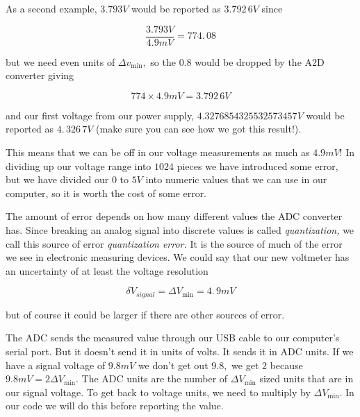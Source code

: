 As a second example, $3.793\unit{V}$ would be reported as $\allowbreak 3.792\,\allowbreak 6\unit{V}$ since 

\begin{equation*}
	\frac{3.793\unit{V}}{4.9\unit{mV}}=774.\,\allowbreak 08
\end{equation*}

\noindent but we need even units of $\Delta v_{\min },$ so the $0.8$ would be dropped by the A2D converter giving 

\begin{equation*}
	774\times 4.9\unit{mV}=\allowbreak 3.792\,\allowbreak 6\unit{V}
\end{equation*}

\noindent and our first voltage from our power supply, $4.3276854325532573457\unit{V}$ would be reported as $4.\,\allowbreak 326\,7\unit{V}$ (make sure you can see how we got this result!).

This means that we can be off in our voltage measurements as much as $4.9\unit{mV}$! In dividing up our voltage range into $1024$ pieces we have introduced some error, but we have divided our $0$ to $5\unit{V}$ into numeric values that we can use in our computer, so it is worth the cost of some error.

The amount of error depends on how many different values the ADC converter has. Since breaking an analog signal into discrete values is called \emph{quantization, }we call this source of error \emph{quantization error.} It is the source of much of the error we see in electronic measuring devices. We could say that our new voltmeter has an uncertainty of at least the voltage resolution

\begin{equation*}
	\delta V_{signal}=\Delta V_{\min }=4.\,\allowbreak 9\unit{mV}
\end{equation*}

\noindent but of course it could be larger if there are other sources of error.

The ADC sends the measured value through our USB cable to our computer's serial port. But it doesn't send it in units of volts. It sends it in ADC units. If we have a signal voltage of $9.8\unit{mV}$ we don't get out $9.8,$ we get $2$ because $9.8\unit{mV}=2\Delta V_{\min }.$ The ADC units are the number of $\Delta V_{\min }$ sized units that are in our signal voltage. To get back to voltage units, we need to multiply by $\Delta V_{\min }.$ In our code we will do this before reporting the value. 

